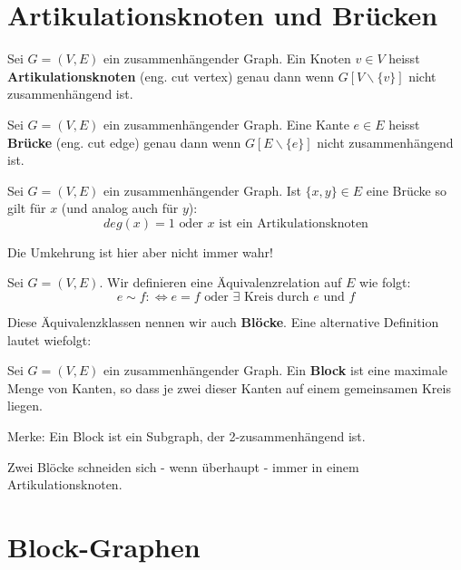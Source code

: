 \documentclass[a4paper]{report}
\begin{document}
\section{Artikulationsknoten und Brücken}

\begin{definition}
    Sei $G = (V,E)$ ein zusammenhängender Graph. Ein Knoten $v \in V$ heisst \textbf{Artikulationsknoten}
    (eng. cut vertex) genau dann wenn $G[V \backslash \{v\}]$ nicht zusammenhängend ist.
\end{definition}

\begin{definition}
    Sei $G = (V,E)$ ein zusammenhängender Graph. Eine Kante $e \in E$ heisst \textbf{Brücke}
    (eng. cut edge) genau dann wenn $G[E \backslash \{e\}]$ nicht zusammenhängend ist.
\end{definition}

\begin{lemma}
    Sei $G = (V,E)$ ein zusammenhängender Graph. Ist $\{x,y\} \in E$ eine Brücke so gilt für $x$
    (und analog auch für $y$): \\
    $$deg(x) = 1 \text{    oder    } x \text{ ist ein Artikulationsknoten}$$
\end{lemma}
\bigskip

Die Umkehrung ist hier aber nicht immer wahr!

\begin{definition}
    Sei $G = (V,E)$. Wir definieren eine Äquivalenzrelation auf $E$ wie folgt:
    $$e \sim f: \Leftrightarrow e = f \text{  oder  } \exists \text{ Kreis durch } e \text{ und } f$$
\end{definition}
\bigskip

Diese Äquivalenzklassen nennen wir auch \textbf{Blöcke}. Eine alternative Definition lautet wiefolgt:

\begin{definition}
    Sei $G = (V,E)$ ein zusammenhängender Graph. Ein \textbf{Block} ist eine maximale Menge von Kanten, so
    dass je zwei dieser Kanten auf einem gemeinsamen Kreis liegen.
\end{definition}
\bigskip

Merke: Ein Block ist ein Subgraph, der 2-zusammenhängend ist.

\begin{lemma}
    Zwei Blöcke schneiden sich - wenn überhaupt - immer in einem Artikulationsknoten.
\end{lemma}
\bigskip

\section{Block-Graphen}
\end{document}
